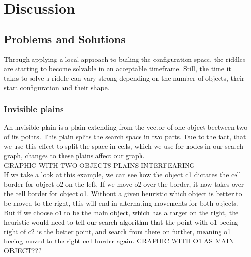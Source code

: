 \chapter{Discussion}
\section{Problems and Solutions}
Through applying a local approach to builing the configuration space, the riddles are starting to become solvable in an acceptable timeframe.
Still, the time it takes to solve a riddle can vary strong depending on the number of objects, their start configuration and their shape. 

\subsection{Invisible plains}
An invisible plain is a plain extending from the vector of one object beetween two of its points. This plain splits the search space in two parts. Due to the fact, that we use this effect to split the space in cells, which we use for nodes in our search graph, changes to these plains affect our graph.\\
GRAPHIC WITH TWO OBJECTS PLAINS INTERFEARING\\
If we take a look at this example, we can see how the object o1 dictates the cell border for object o2 on the left. If we move o2 over the border, it now takes over the cell border for object o1. Without a given heuristic which object is better to be moved to the right, this will end in alternating movements for both objects.\\
But if we choose o1 to be the main object, which has a target on the right, the heuristic would need to tell our search algorithm that the point with o1 beeing right of o2 is the better point, and search from there on further, meaning o1 beeing moved to the right cell border again.
GRAPHIC WITH O1 AS MAIN OBJECT???

